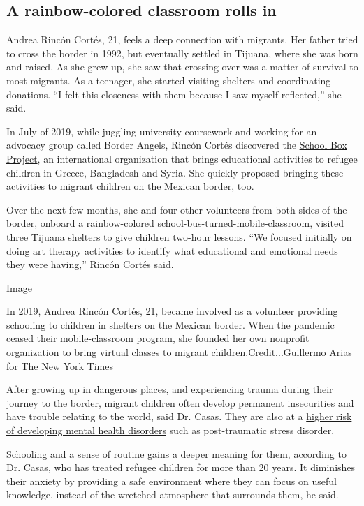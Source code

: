 \hypertarget{a-rainbow-colored-classroom-rolls-in}{%
\subsection{A rainbow-colored classroom rolls
in}\label{a-rainbow-colored-classroom-rolls-in}}

Andrea Rincón Cortés, 21, feels a deep connection with migrants. Her
father tried to cross the border in 1992, but eventually settled in
Tijuana, where she was born and raised. As she grew up, she saw that
crossing over was a matter of survival to most migrants. As a teenager,
she started visiting shelters and coordinating donations. ``I felt this
closeness with them because I saw myself reflected,'' she said.

In July of 2019, while juggling university coursework and working for an
advocacy group called Border Angels, Rincón Cortés discovered the
\href{https://www.schoolboxproject.org/us-mexican-border}{School Box
Project}, an international organization that brings educational
activities to refugee children in Greece, Bangladesh and Syria. She
quickly proposed bringing these activities to migrant children on the
Mexican border, too.

Over the next few months, she and four other volunteers from both sides
of the border, onboard a rainbow-colored
school-bus-turned-mobile-classroom, visited three Tijuana shelters to
give children two-hour lessons. ``We focused initially on doing art
therapy activities to identify what educational and emotional needs they
were having,'' Rincón Cortés said.

Image

In 2019, Andrea Rincón Cortés, 21, became involved as a volunteer
providing schooling to children in shelters on the Mexican border. When
the pandemic ceased their mobile-classroom program, she founded her own
nonprofit organization to bring virtual classes to migrant
children.Credit...Guillermo Arias for The New York Times

After growing up in dangerous places, and experiencing trauma during
their journey to the border, migrant children often develop permanent
insecurities and have trouble relating to the world, said Dr. Casas.
They are also at a
\href{https://oxfordre.com/publichealth/view/10.1093/acrefore/9780190632366.001.0001/acrefore-9780190632366-e-12}{higher
risk of developing mental health disorders} such as post-traumatic
stress disorder.

Schooling and a sense of routine gains a deeper meaning for them,
according to Dr. Casas, who has treated refugee children for more than
20 years. It
\href{https://onlinelibrary.wiley.com/doi/10.1002/9780470669280.ch12}{diminishes
their anxiety} by providing a safe environment where they can focus on
useful knowledge, instead of the wretched atmosphere that surrounds
them, he said.

